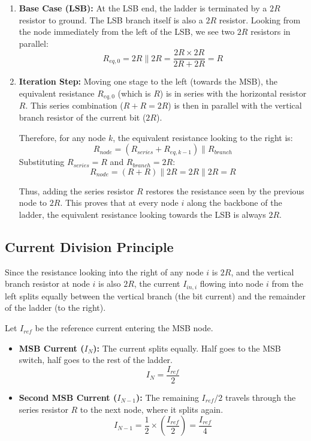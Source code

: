 \documentclass[conference]{IEEEtran}
\begin{document}
\begin{enumerate}
    \item \textbf{Base Case (LSB):}
    At the LSB end, the ladder is terminated by a $2R$ resistor to ground. The LSB branch itself is also a $2R$ resistor. Looking from the node immediately from the left of the LSB, we see two $2R$ resistors in parallel:
    \begin{equation}
        R_{eq, 0} = 2R \parallel 2R = \frac{2R \times 2R}{2R + 2R} = R
    \end{equation}
    
    \item \textbf{Iteration Step:}
    Moving one stage to the left (towards the MSB), the equivalent resistance $R_{eq, 0}$ (which is $R$) is in series with the horizontal resistor $R$. This series combination ($R + R = 2R$) is then in parallel with the vertical branch resistor of the current bit ($2R$).
    
    Therefore, for any node $k$, the equivalent resistance looking to the right is:
    \begin{equation}
        R_{node} = (R_{series} + R_{eq, k-1}) \parallel R_{branch}
    \end{equation}
    Substituting $R_{series}=R$ and $R_{branch}=2R$:
    \begin{equation}
        R_{node} = (R + R) \parallel 2R = 2R \parallel 2R = R
    \end{equation}
    
    Thus, adding the series resistor $R$ restores the resistance seen by the previous node to $2R$. This proves that at every node $i$ along the backbone of the ladder, the equivalent resistance looking towards the LSB is always $2R$.
\end{enumerate}

\subsection{Current Division Principle}
Since the resistance looking into the right of any node $i$ is $2R$, and the vertical branch resistor at node $i$ is also $2R$, the current $I_{in, i}$ flowing into node $i$ from the left splits equally between the vertical branch (the bit current) and the remainder of the ladder (to the right).

Let $I_{ref}$ be the reference current entering the MSB node.
\begin{itemize}
    \item \textbf{MSB Current ($I_{N}$):} The current splits equally. Half goes to the MSB switch, half goes to the rest of the ladder.
    \begin{equation}
        I_{N} = \frac{I_{ref}}{2}
    \end{equation}
    \item \textbf{Second MSB Current ($I_{N-1}$):} The remaining $I_{ref}/2$ travels through the series resistor $R$ to the next node, where it splits again.
    \begin{equation}
        I_{N-1} = \frac{1}{2} \times \left( \frac{I_{ref}}{2} \right) = \frac{I_{ref}}{4}
    \end{equation}
\end{itemize}
\end{document}
